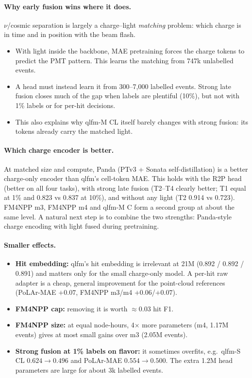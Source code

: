 \documentclass[11pt,a4paper]{article}
\begin{document}
\paragraph{Why early fusion wins where it does.}
$\nu$/cosmic separation is largely a charge--light \emph{matching} problem: which charge is in time and in position with the beam flash.
\begin{itemize}
  \item With light inside the backbone, MAE pretraining forces the charge tokens to predict the PMT pattern. This learns the matching from 747k unlabelled events.
  \item A head must instead learn it from 300--7{,}000 labelled events. Strong late fusion closes much of the gap when labels are plentiful (10\%), but not with 1\% labels or for per-hit decisions.
  \item This also explains why qlfm-M CL itself barely changes with strong fusion: its tokens already carry the matched light.
\end{itemize}

\paragraph{Which charge encoder is better.}
At matched size and compute, Panda (PTv3 + Sonata self-distillation) is a better charge-only encoder than qlfm's cell-token MAE. This holds with the R2P head (better on all four tasks), with strong late fusion (T2--T4 clearly better; T1 equal at 1\% and 0.823 vs 0.837 at 10\%), and without any light (T2 0.914 vs 0.723). FM4NPP m3, FM4NPP m4 and qlfm-M C form a second group at about the same level. A natural next step is to combine the two strengths: Panda-style charge encoding with light fused during pretraining.

\paragraph{Smaller effects.}
\begin{itemize}
  \item \textbf{Hit embedding:} qlfm's hit embedding is irrelevant at 21M (0.892 / 0.892 / 0.891) and matters only for the small charge-only model. A per-hit raw adapter is a cheap, general improvement for the point-cloud references (PoLAr-MAE $+0.07$, FM4NPP m3/m4 $+0.06$/$+0.07$).
  \item \textbf{FM4NPP cap:} removing it is worth $\approx$0.03 hit F1.
  \item \textbf{FM4NPP size:} at equal node-hours, 4$\times$ more parameters (m4, 1.17M events) gives at most small gains over m3 (2.05M events).
  \item \textbf{Strong fusion at 1\% labels on flavor:} it sometimes overfits, e.g.\ qlfm-S CL $0.624\to0.496$ and PoLAr-MAE $0.554\to0.500$. The extra 1.2M head parameters are large for about 3k labelled events.
\end{itemize}
\end{document}
